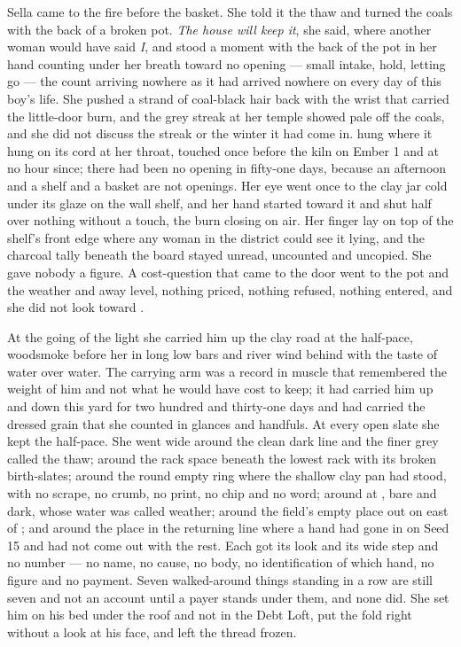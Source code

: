 \scenebreak

Sella came to the fire before the basket. She told it the thaw and turned the coals with the back of a broken pot. \emph{The house will keep it}, she said, where another woman would have said \emph{I}, and stood a moment with the back of the pot in her hand counting under her breath toward no opening --- small intake, hold, letting go --- the count arriving nowhere as it had arrived nowhere on every day of this boy's life. She pushed a strand of coal-black hair back with the wrist that carried the little-door burn, and the grey streak at her temple showed pale off the coals, and she did not discuss the streak or the winter it had come in.  hung where it hung on its cord at her throat, touched once before the kiln on Ember 1 and at no hour since; there had been no opening in fifty-one days, because an afternoon and a shelf and a basket are not openings. Her eye went once to the clay jar cold under its glaze on the wall shelf, and her hand started toward it and shut half over nothing without a touch, the burn closing on air. Her finger lay on top of the shelf's front edge where any woman in the district could see it lying, and the charcoal tally beneath the board stayed unread, uncounted and uncopied. She gave nobody a figure. A cost-question that came to the door went to the pot and the weather and away level, nothing priced, nothing refused, nothing entered, and she did not look toward .

At the going of the light she carried him up the clay road at the half-pace, woodsmoke before her in long low bars and river wind behind with the taste of water over water. The carrying arm was a record in muscle that remembered the weight of him and not what he would have cost to keep; it had carried him up and down this yard for two hundred and thirty-one days and had carried the dressed grain that she counted in glances and handfuls. At every open slate she kept the half-pace. She went wide around the clean dark line and the finer grey called the thaw; around the rack space beneath the lowest rack with its broken birth-slates; around the round empty ring where the shallow clay pan had stood, with no scrape, no crumb, no print, no chip and no word; around  at , bare and dark, whose water was called weather; around the field's empty place out on  east of ; and around the place in the returning line where a hand had gone in on Seed 15 and had not come out with the rest. Each got its look and its wide step and no number --- no name, no cause, no body, no identification of which hand, no figure and no payment. Seven walked-around things standing in a row are still seven and not an account until a payer stands under them, and none did. She set him on his bed under the roof and not in the Debt Loft, put the fold right without a look at his face, and left the thread frozen.

